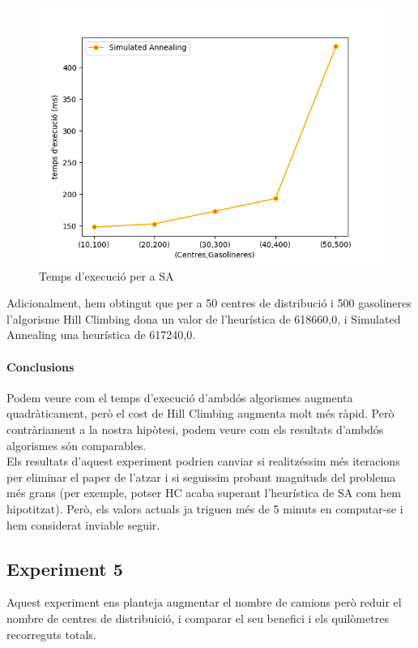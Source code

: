 \documentclass[a4paper]{article}
\begin{document}
\begin{figure}[htp]
\centering
\includegraphics[scale=0.90]{images/experiment4-2.png}
\caption{Temps d'execució per a SA}
\centering
\end{figure}

Adicionalment, hem obtingut que per a 50 centres de distribució i 500 gasolineres l'algorisme Hill Climbing dona un valor de l'heurística de 618660,0, i Simulated Annealing una heurística de 617240,0.

\newpage
\paragraph{Conclusions} Podem veure com el temps d'execució d'ambdós algorismes augmenta quadràticament, però el cost de Hill Climbing augmenta molt més ràpid. Però contràriament a la nostra hipòtesi, podem veure com els resultats d'ambdós algorismes són comparables.\\

Els resultats d'aquest experiment podrien canviar si realitzéssim més iteracions per eliminar el paper de l'atzar i si seguissim probant magnituds del problema més grans (per exemple, potser HC acaba superant l'heurística de SA com hem hipotitzat). Però, els valors actuals ja triguen més de 5 minuts en computar-se i hem considerat inviable seguir.
\newpage

\subsection{Experiment 5}
Aquest experiment ens planteja augmentar el nombre de camions però reduir el nombre de centres de distribuició, i comparar el seu benefici i els quilòmetres recorreguts totals.
\end{document}
